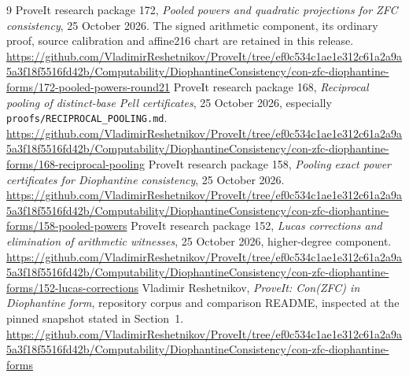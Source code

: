 \documentclass[10pt,letterpaper]{article}
\theoremstyle{remark}\newtheorem{remark}[theorem]{Remark}
\begin{document}
\begin{thebibliography}{9}
 ProveIt research package 172,
\emph{Pooled powers and quadratic projections for ZFC consistency},
25 October 2026. The signed arithmetic component, its ordinary proof,
source calibration and affine216 chart are retained in this release.
\url{https://github.com/VladimirReshetnikov/ProveIt/tree/ef0c534c1ae1e312c61a2a9a5a3f18f5516fd42b/Computability/DiophantineConsistency/con-zfc-diophantine-forms/172-pooled-powers-round21}
 ProveIt research package 168,
\emph{Reciprocal pooling of distinct-base Pell certificates},
25 October 2026, especially \texttt{proofs/RECIPROCAL\_POOLING.md}.
\url{https://github.com/VladimirReshetnikov/ProveIt/tree/ef0c534c1ae1e312c61a2a9a5a3f18f5516fd42b/Computability/DiophantineConsistency/con-zfc-diophantine-forms/168-reciprocal-pooling}
 ProveIt research package 158,
\emph{Pooling exact power certificates for Diophantine consistency},
25 October 2026.
\url{https://github.com/VladimirReshetnikov/ProveIt/tree/ef0c534c1ae1e312c61a2a9a5a3f18f5516fd42b/Computability/DiophantineConsistency/con-zfc-diophantine-forms/158-pooled-powers}
 ProveIt research package 152,
\emph{Lucas corrections and elimination of arithmetic witnesses},
25 October 2026, higher-degree component.
\url{https://github.com/VladimirReshetnikov/ProveIt/tree/ef0c534c1ae1e312c61a2a9a5a3f18f5516fd42b/Computability/DiophantineConsistency/con-zfc-diophantine-forms/152-lucas-corrections}
 Vladimir Reshetnikov, \emph{ProveIt: Con(ZFC) in
Diophantine form}, repository corpus and comparison README, inspected
at the pinned snapshot stated in Section~1.
\url{https://github.com/VladimirReshetnikov/ProveIt/tree/ef0c534c1ae1e312c61a2a9a5a3f18f5516fd42b/Computability/DiophantineConsistency/con-zfc-diophantine-forms}
\end{thebibliography}
\end{document}
